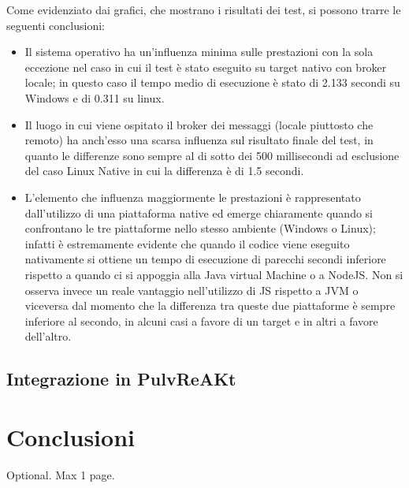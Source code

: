\documentclass[12pt,a4paper,openright,twoside]{book}
\begin{document}
Come evidenziato dai grafici, che mostrano i risultati dei test, si possono trarre le seguenti conclusioni:
\begin{itemize}
    \item Il sistema operativo ha un’influenza minima sulle prestazioni con la sola eccezione nel caso in cui il test è stato eseguito su target nativo con broker locale; 
    in questo caso il tempo medio di esecuzione è stato di 2.133 secondi su Windows e di 0.311 su linux.

    \item Il luogo in cui viene ospitato il broker dei messaggi (locale piuttosto che remoto) ha anch’esso una scarsa influenza sul risultato finale del test, 
    in quanto le differenze sono sempre al di sotto dei 500 millisecondi ad esclusione del caso Linux Native in cui la differenza è di 1.5 secondi. 

    \item L’elemento che influenza maggiormente le prestazioni è rappresentato dall’utilizzo di una piattaforma native ed emerge chiaramente quando si confrontano 
    le tre piattaforme nello stesso ambiente (Windows o Linux); infatti è estremamente evidente che quando il codice viene eseguito nativamente si ottiene un tempo 
    di esecuzione di parecchi secondi inferiore rispetto a quando ci si appoggia alla Java virtual Machine o a NodeJS. Non si osserva invece un reale vantaggio nell’utilizzo 
    di \ac{JS} rispetto a \ac{JVM} o viceversa dal momento che la differenza tra queste due piattaforme è sempre inferiore al secondo, in alcuni casi a favore di un target e in altri a 
    favore dell'altro.

\end{itemize}

\section{Integrazione in PulvReAKt}

\chapter{Conclusioni}\label{chap:Conclusioni}


\backmatter

\nocite{*} %




\begin{acknowledgements} %
Optional. Max 1 page.
\end{acknowledgements}
\end{document}
